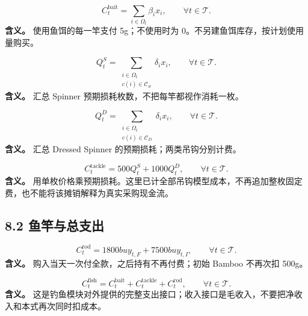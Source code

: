 \documentclass[11pt,a4paper]{article}
\begin{document}
\begin{samepage}
\[
C_t^{\mathrm{bait}}=\sum_{i\in\Omega_t}\beta_ix_i,\qquad \forall t\in\mathcal T. \tag{C22}
\]
\textbf{含义。} 使用鱼饵的每一竿支付 5g；不使用时为 0。不另建鱼饵库存，按计划使用量购买。\par
\end{samepage}

\begin{samepage}
\[
Q_t^S=\sum_{\substack{i\in\Omega_t\\c(i)\in\mathcal C_S}}\delta_ix_i,
\qquad \forall t\in\mathcal T. \tag{C23}
\]
\textbf{含义。} 汇总 Spinner 预期损耗枚数，不把每竿都视作消耗一枚。\par
\end{samepage}

\begin{samepage}
\[
Q_t^D=\sum_{\substack{i\in\Omega_t\\c(i)\in\mathcal C_D}}\delta_ix_i,
\qquad \forall t\in\mathcal T. \tag{C24}
\]
\textbf{含义。} 汇总 Dressed Spinner 的预期损耗；两类吊钩分别计费。\par
\end{samepage}

\begin{samepage}
\[
C_t^{\mathrm{tackle}}=500Q_t^S+1000Q_t^D,\qquad \forall t\in\mathcal T. \tag{C25}
\]
\textbf{含义。} 用单枚价格乘预期损耗。这里已计全部吊钩模型成本，不再追加整枚固定费，也不能将该摊销解释为真实采购现金流。\par
\end{samepage}

\subsection*{8.2 鱼竿与总支出}

\begin{samepage}
\[
C_t^{\mathrm{rod}}=1800buy_{t,F}+7500buy_{t,I},\qquad \forall t\in\mathcal T. \tag{C26}
\]
\textbf{含义。} 购入当天一次付全款，之后持有不再付费；初始 Bamboo 不再次扣 500g。\par
\end{samepage}

\begin{samepage}
\[
C_t^{\mathrm{fish}}=C_t^{\mathrm{bait}}+C_t^{\mathrm{tackle}}+C_t^{\mathrm{rod}},\qquad \forall t\in\mathcal T. \tag{C27}
\]
\textbf{含义。} 这是钓鱼模块对外提供的完整支出接口；收入接口是毛收入，不要把净收入和本式再次同时扣成本。\par
\end{samepage}
\end{document}
